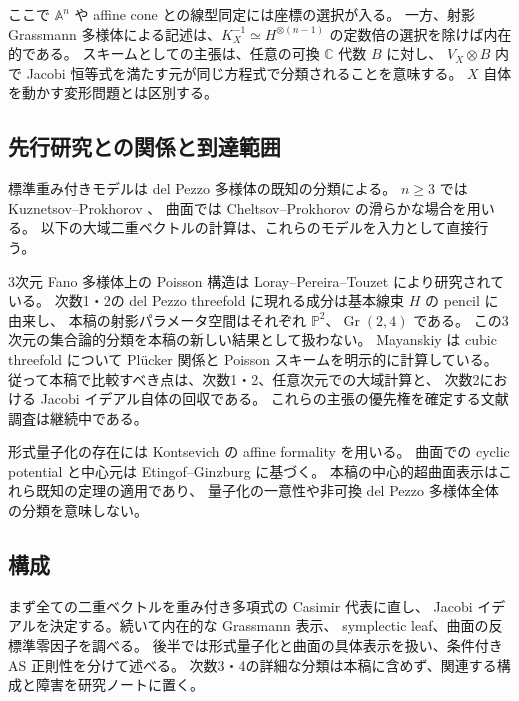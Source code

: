 \documentclass[a4paper,11pt]{ltjsarticle}
\numberwithin{equation}{section}
\theoremstyle{plain}
\theoremstyle{definition}
\newcommand{\C}{\mathbb C}
\newcommand{\Gr}{\operatorname{Gr}}
\begin{document}
ここで $\mathbb A^n$ や affine cone との線型同定には座標の選択が入る。
一方、射影 Grassmann 多様体による記述は、$K_X^{-1}\simeq H^{\otimes(n-1)}$
の定数倍の選択を除けば内在的である。
スキームとしての主張は、任意の可換 $\C$ 代数 $B$ に対し、
$V_X\otimes B$ 内で Jacobi 恒等式を満たす元が同じ方程式で分類されることを意味する。
$X$ 自体を動かす変形問題とは区別する。

\subsection{先行研究との関係と到達範囲}
標準重み付きモデルは del Pezzo 多様体の既知の分類による。
$n\geq3$ では Kuznetsov--Prokhorov \cite[Theorem 1.2(i),(ii)]{KP2023}、
曲面では Cheltsov--Prokhorov \cite[Theorem 2.5]{CP2021} の滑らかな場合を用いる。
以下の大域二重ベクトルの計算は、これらのモデルを入力として直接行う。

3次元 Fano 多様体上の Poisson 構造は Loray--Pereira--Touzet
\cite[Theorems 7.1, 9.1]{LPT2013} により研究されている。
次数1・2の del Pezzo threefold に現れる成分は基本線束 $H$ の pencil に由来し、
本稿の射影パラメータ空間はそれぞれ $\mathbb P^2$、$\Gr(2,4)$ である。
この3次元の集合論的分類を本稿の新しい結果として扱わない。
Mayanskiy \cite[Introduction, Theorem 1]{Mayanskiy2015} は cubic threefold について
Pl\"ucker 関係と Poisson スキームを明示的に計算している。
従って本稿で比較すべき点は、次数1・2、任意次元での大域計算と、
次数2における Jacobi イデアル自体の回収である。
これらの主張の優先権を確定する文献調査は継続中である。

形式量子化の存在には Kontsevich の affine formality \cite{Kontsevich} を用いる。
曲面での cyclic potential と中心元は
Etingof--Ginzburg \cite[Lemma 7.4.2, Proposition 8.1.1(i)]{EG2010} に基づく。
本稿の中心的超曲面表示はこれら既知の定理の適用であり、
量子化の一意性や非可換 del Pezzo 多様体全体の分類を意味しない。

\subsection{構成}
まず全ての二重ベクトルを重み付き多項式の Casimir 代表に直し、
Jacobi イデアルを決定する。続いて内在的な Grassmann 表示、
symplectic leaf、曲面の反標準零因子を調べる。
後半では形式量子化と曲面の具体表示を扱い、条件付き AS 正則性を分けて述べる。
次数3・4の詳細な分類は本稿に含めず、関連する構成と障害を研究ノートに置く。




\end{document}
